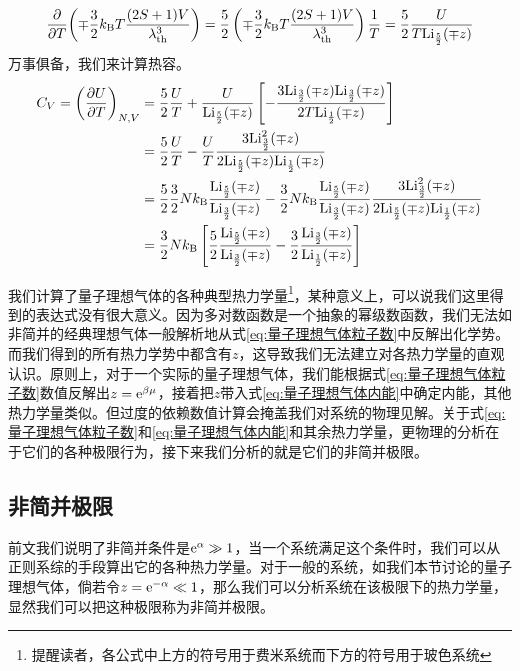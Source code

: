 \documentclass[../../main.tex]{subfiles}
\begin{document}
\begin{example}
\begin{solution}
        \begin{equation}
            \pdv{T}(\mp\frac{3}{2}k_{\mathrm{B}} T\frac{(2S+1)V}{\lambda_{\mathrm{th}}^{3}})=\frac{5}{2}\left(\mp\frac{3}{2}k_{\mathrm{B}} T\frac{(2S+1)V}{\lambda_{\mathrm{th}}^{3}}\right)\frac{1}{T}=\frac{5}{2}\frac{U}{T\mathrm{Li}_{\frac{5}{2}}(\mp z)}
        \end{equation}
        万事俱备，我们来计算热容。
        \begin{equation}
            \begin{split}
                C_V=\left(\pdv{U}{T}\right)_{N,V}&=\frac{5}{2}\frac{U}{T}+\frac{U}{\mathrm{Li}_{\frac{5}{2}}(\mp z)}\left[-\frac{3\mathrm{Li}_{\frac{3}{2}}(\mp z)\mathrm{Li}_{\frac{3}{2}}(\mp z)}{2T\mathrm{Li}_{\frac{1}{2}}(\mp z)}\right] \\
                &=\frac{5}{2}\frac{U}{T}-\frac{U}{T}\frac{3\mathrm{Li}_{\frac{3}{2}}^2(\mp z)}{2\mathrm{Li}_{\frac{5}{2}}(\mp z)\mathrm{Li}_{\frac{1}{2}}(\mp z)} \\
                &=\frac{5}{2}\frac{3}{2}Nk_{\mathrm{B}}\frac{\mathrm{Li}_{\frac{5}{2}}(\mp z)}{\mathrm{Li}_{\frac{3}{2}}(\mp z)}-\frac{3}{2}Nk_{\mathrm{B}}\frac{\mathrm{Li}_{\frac{5}{2}}(\mp z)}{\mathrm{Li}_{\frac{3}{2}}(\mp z)}\frac{3\mathrm{Li}_{\frac{3}{2}}^2(\mp z)}{2\mathrm{Li}_{\frac{5}{2}}(\mp z)\mathrm{Li}_{\frac{1}{2}}(\mp z)} \\
                &=\frac{3}{2}Nk_{\mathrm{B}}\left[\frac{5}{2}\frac{\mathrm{Li}_{\frac{5}{2}}(\mp z)}{\mathrm{Li}_{\frac{3}{2}}(\mp z)}-\frac{3}{2}\frac{\mathrm{Li}_{\frac{3}{2}}(\mp z)}{\mathrm{Li}_{\frac{1}{2}}(\mp z)}\right]
            \end{split}
        \end{equation}
    \end{solution}
\end{example}

我们计算了量子理想气体的各种典型热力学量\footnote{提醒读者，各公式中上方的符号用于费米系统而下方的符号用于玻色系统}，某种意义上，可以说我们这里得到的表达式没有很大意义。因为多对数函数是一个抽象的幂级数函数，我们无法如非简并的经典理想气体一般解析地从式\eqref{eq:量子理想气体粒子数}中反解出化学势。而我们得到的所有热力学势中都含有\(z\)，这导致我们无法建立对各热力学量的直观认识。原则上，对于一个实际的量子理想气体，我们能根据式\eqref{eq:量子理想气体粒子数}数值反解出\(z=\mathrm{e}^{\beta\mu}\)，接着把\(z\)带入式\eqref{eq:量子理想气体内能}中确定内能，其他热力学量类似。但过度的依赖数值计算会掩盖我们对系统的物理见解。关于式\eqref{eq:量子理想气体粒子数}和\eqref{eq:量子理想气体内能}和其余热力学量，更物理的分析在于它们的各种极限行为，接下来我们分析的就是它们的非简并极限。

\subsection{非简并极限}
前文我们说明了非简并条件是\(\mathrm{e}^{\alpha}\gg 1\)，当一个系统满足这个条件时，我们可以从正则系综的手段算出它的各种热力学量。对于一般的系统，如我们本节讨论的量子理想气体，倘若令\(z=\mathrm{e}^{-\alpha}\ll 1\)，那么我们可以分析系统在该极限下的热力学量，显然我们可以把这种极限称为非简并极限。
\end{document}
